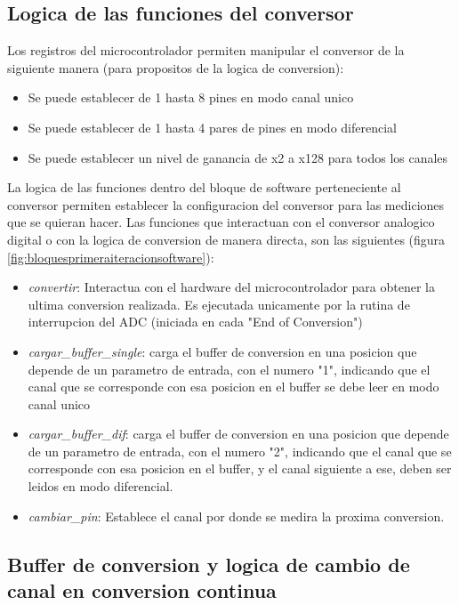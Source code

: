 \subsection{Logica de las funciones del conversor} %
\label{sub:logica_de_las_funciones_del_conversor}

Los registros del microcontrolador permiten manipular el conversor de la siguiente manera (para propositos de la logica de conversion):

\begin{itemize}
  \item Se puede establecer de 1 hasta 8 pines en modo canal unico
  \item Se puede establecer de 1 hasta 4 pares de pines en modo diferencial
  \item Se puede establecer un nivel de ganancia de x2 a x128 para todos los canales
\end{itemize}

La logica de las funciones dentro del bloque de software perteneciente al conversor permiten establecer la configuracion del conversor para las mediciones que se quieran hacer. Las funciones que interactuan con el conversor analogico digital o con la logica de conversion de manera directa, son las siguientes (figura \ref{fig:bloquesprimeraiteracionsoftware}):

\begin{itemize}
  \item \textit{convertir}: Interactua con el hardware del microcontrolador para obtener la ultima conversion realizada. Es ejecutada unicamente por la rutina de interrupcion del ADC (iniciada en cada "End of Conversion")
  \item \textit{cargar\_buffer\_single}: carga el buffer de conversion en una posicion que depende de un parametro de entrada, con el numero "1", indicando que el canal que se corresponde con esa posicion en el buffer se debe leer en modo canal unico
  \item \textit{cargar\_buffer\_dif}: carga el buffer de conversion en una posicion que depende de un parametro de entrada, con el numero "2", indicando que el canal que se corresponde con esa posicion en el buffer, y el canal siguiente a ese, deben ser leidos en modo diferencial.
  \item \textit{cambiar\_pin}: Establece el canal por donde se medira la proxima conversion.
\end{itemize}

\subsection{Buffer de conversion y logica de cambio de canal en conversion continua} %
\label{sub:buffer_de_conversion_y_logica_de_cambio_de_canal_en_conversion_continua}

